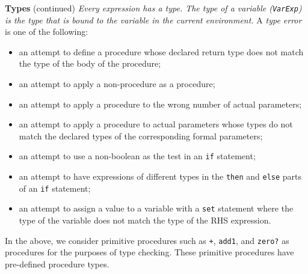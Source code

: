 \begin{minipage}[t]{\sw}
\slidenumber
\LARGE
{\bf Types} (continued)\exx
{\em Every expression has a type.
The type of a variable (\verb'VarExp')
is the type that is bound to the variable in the current environment.}\exx
A {\em type error} is one of the following:
\begin{itemize}
\itemsep -0.5ex
\item an attempt to define a procedure whose declared return type
      does not match the type of the body of the procedure;
\item an attempt to apply a non-procedure as a procedure;
\item an attempt to apply a procedure to the wrong number
      of actual parameters;
\item an attempt to apply a procedure to actual parameters whose types
      do not match the declared types
      of the corresponding formal parameters;
\item an attempt to use a non-boolean as the test in an \verb'if' statement;
\item an attempt to have expressions of different types
      in the \verb'then' and \verb'else' parts of an \verb'if' statement;
\item an attempt to assign a value
      to a variable with a \verb'set' statement
      where the type of the variable does not match the type
      of the RHS expression.
\end{itemize}
In the above, we consider primitive procedures
such as \verb'+', \verb'add1', and \verb'zero?' as procedures
for the purposes of type checking.
These primitive procedures have pre-defined procedure types.
\end{minipage}
